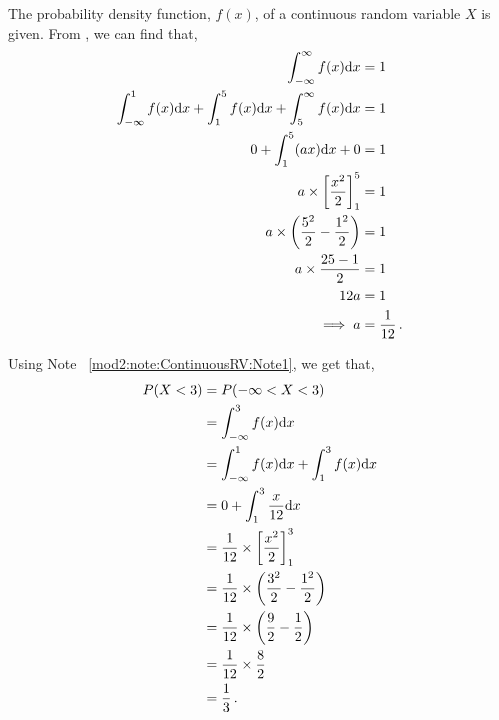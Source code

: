%
%


\begin{subquestions}
	
\subquestion


The probability density function, $f(x)$, of a continuous random variable $X$ is given.
From , we can find that,
\begin{align}
	\int_{-\infty}^{\infty} f(x)\mathrm{d}x  & = 1 \nonumber \\
	\int_{-\infty}^{1} f(x)\mathrm{d}x+\int_{1}^{5} f(x)\mathrm{d}x+\int_{5}^{\infty} f(x)\mathrm{d}x & = 1 \nonumber \\
	0 + \int_{1}^{5} (ax)\mathrm{d}x + 0 & = 1 \nonumber \\
	a \times \left[\frac{x^2}{2}\right]^5_1 & = 1 \nonumber \\
	a \times \left(\frac{5^2}{2}- \frac{1^2}{2}\right) & = 1 \nonumber \\
	a \times \frac{25-1}{2} & = 1 \nonumber \\
	12a & = 1 \nonumber \\
	\implies a & = \frac{1}{12} \,.
\end{align}
	

\subquestion

Using Note ~\ref{mod2:note:ContinuousRV:Note1}, we get that,
\begin{align}
	P(X<3) & = P(-\infty<X<3) \nonumber \\
	       & = \int_{-\infty}^{3} f(x)\mathrm{d}x \nonumber \\
	       & = \int_{-\infty}^{1} f(x)\mathrm{d}x + \int_{1}^{3} f(x)\mathrm{d}x \nonumber \\
	       & = 0 + \int_{1}^{3}\frac{x}{12} \mathrm{d}x \nonumber \\
	       & = \frac{1}{12} \times \left[\frac{x^2}{2}\right]^3_1 \nonumber \\
	       & = \frac{1}{12} \times \left(\frac{3^2}{2} - \frac{1^2}{2}\right) \nonumber \\
	       & = \frac{1}{12} \times \left(\frac{9}{2} - \frac{1}{2}\right) \nonumber \\
	       & = \frac{1}{12} \times \frac{8}{2} \nonumber \\
	       & = \frac{1}{3} \,. 
\end{align}
	

\end{subquestions}

